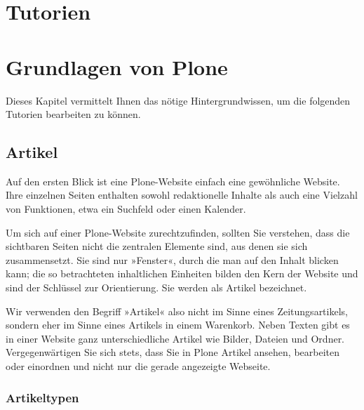 \documentclass[a4paper,12pt,ngerman]{manual}
\begin{document}
\resetcurrentobjects
\hypertarget{--doc-Tutorium}{}

\chapter{Tutorien}

\resetcurrentobjects
\hypertarget{--doc-grundlagen/grundlagen}{}

\hypertarget{grundlagen-von-plone}{}\chapter{Grundlagen von Plone}

Dieses Kapitel vermittelt Ihnen das nötige Hintergrundwissen, um die
folgenden Tutorien bearbeiten zu können.

\resetcurrentobjects
\hypertarget{--doc-grundlagen/objekte}{}

\hypertarget{artikel}{}\section{Artikel}

Auf den ersten Blick ist eine Plone-Website einfach eine gewöhnliche Website.
Ihre einzelnen Seiten enthalten sowohl redaktionelle Inhalte als auch eine
Vielzahl von Funktionen, etwa ein Suchfeld oder einen Kalender.

Um sich auf einer Plone-Website zurechtzufinden, sollten Sie verstehen, dass
die sichtbaren Seiten nicht die zentralen Elemente sind, aus denen sie sich
zusammensetzt. Sie sind nur »Fenster«, durch die man auf den Inhalt blicken
kann; die so betrachteten inhaltlichen Einheiten bilden den Kern der Website
und sind der Schlüssel zur Orientierung. Sie werden als Artikel bezeichnet.

Wir verwenden den Begriff »Artikel« also nicht im Sinne eines
Zeitungsartikels, sondern eher im Sinne eines Artikels in einem Warenkorb.
Neben Texten gibt es in einer Website ganz unterschiedliche Artikel wie
Bilder, Dateien und Ordner. Vergegenwärtigen Sie sich stets, dass Sie in Plone
Artikel ansehen, bearbeiten oder einordnen und nicht nur die gerade angezeigte
Webseite.


\hypertarget{ueberblick-inhaltstypen}{}\subsection{Artikeltypen}
\end{document}

